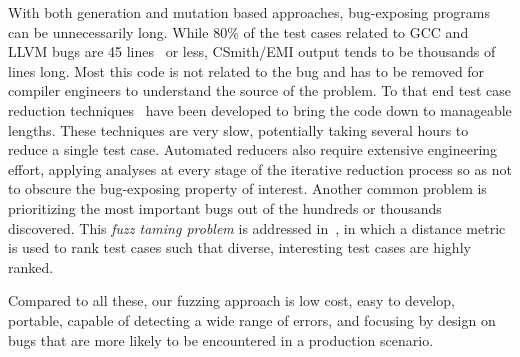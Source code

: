 With both generation and mutation based approaches, bug-exposing programs can be unnecessarily long. While 80\% of the test cases related to GCC and LLVM bugs are 45 lines~\cite{Sun2016} or less, CSmith/EMI output tends to be thousands of lines long. Most this code is not related to the bug and has to be removed for compiler engineers to understand the source of the problem. To that end test case reduction techniques~\cite{Regehr2012a,Pflanzer2016,Herfert} have been developed to bring the code down to manageable lengths. These techniques are very slow, potentially taking several hours to reduce a single test case. Automated reducers also require extensive engineering effort, applying analyses at every stage of the iterative reduction process so as not to obscure the bug-exposing property of interest. Another common problem is prioritizing the most important bugs out of the hundreds or thousands discovered. This \emph{fuzz taming problem} is addressed in~\cite{Chen2013}, in which a distance metric is used to rank test cases such that diverse, interesting test cases are highly ranked. %

Compared to all these, our fuzzing approach is low cost, easy to develop, portable, capable of detecting a wide range of errors, and focusing by design on bugs that are more likely to be encountered in a production scenario.





